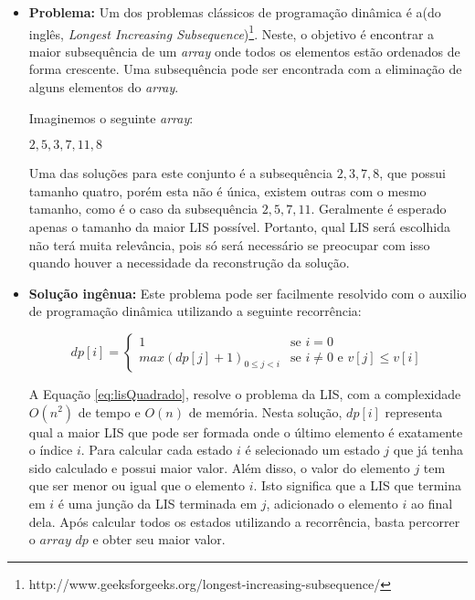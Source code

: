 \begin{itemize}[leftmargin=-.001in]
 \item \textbf{Problema:} Um dos problemas clássicos de programação dinâmica é a(do inglês, \textit{Longest Increasing Subsequence})\footnote{http://www.geeksforgeeks.org/longest-increasing-subsequence/}. Neste, o objetivo é encontrar a maior subsequência de um \textit{array} onde todos os elementos estão ordenados de forma crescente. Uma subsequência pode ser encontrada com a eliminação de alguns elementos do \textit{array}.

Imaginemos o seguinte \textit{array}:

\begin{center}
	${2, 5, 3, 7, 11, 8}$
\end{center}

Uma das soluções para este conjunto é a subsequência ${2, 3, 7, 8}$, que possui tamanho quatro, porém esta não é única, existem outras com o mesmo tamanho, como é o caso da subsequência ${2, 5, 7, 11}$. Geralmente é esperado apenas o tamanho da maior LIS possível. Portanto, qual LIS será escolhida não terá muita relevância, pois só será necessário se preocupar com isso quando houver a necessidade da reconstrução da solução.

\item \textbf{Solução ingênua:} Este problema pode ser facilmente resolvido com o auxilio de programação dinâmica utilizando a seguinte recorrência:

\begin{equation}
dp[i] = 
\begin{cases}
1 &\text{se } i = 0 \\
max(dp[j] + 1)_{0 \leq j < i} &\text{se } i \neq 0 \text{ e } v[j] \leq v[i]

\end{cases}
\label{eq:lisQuadrado}
\end{equation}

A Equação \ref{eq:lisQuadrado}, resolve o problema da LIS, com a complexidade $O(n^2)$ de tempo e $O(n)$ de memória. Nesta solução, $dp[i]$ representa qual a maior LIS que pode ser formada onde o último elemento é exatamente o índice $i$. Para calcular cada estado $i$ é selecionado um estado $j$ que já tenha sido calculado e possui maior valor. Além disso, o valor do elemento $j$ tem que ser menor ou igual que o elemento $i$. Isto significa que a LIS que termina em $i$ é uma junção da LIS terminada em $j$, adicionado o elemento $i$ ao final dela. Após calcular todos os estados utilizando a recorrência, basta percorrer o $array$ $dp$ e obter seu maior valor.


\end{itemize}
